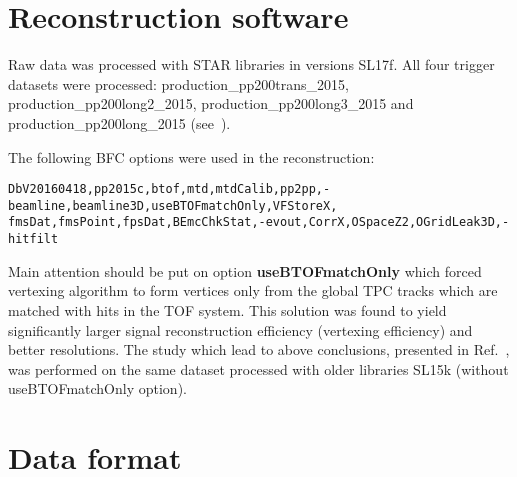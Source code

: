 

\section{Reconstruction software}\label{sec:recoSoftware}

Raw data was processed with STAR libraries in versions SL17f. All four trigger datasets were processed: production\_pp200trans\_2015, production\_pp200long2\_2015, production\_pp200long3\_2015 and production\_pp200long\_2015 (see~\cite{ProductionList}).

The following BFC options were used in the reconstruction:\vspace{-5pt}
\begin{verbatim}
DbV20160418,pp2015c,btof,mtd,mtdCalib,pp2pp,-beamline,beamline3D,useBTOFmatchOnly,VFStoreX,
fmsDat,fmsPoint,fpsDat,BEmcChkStat,-evout,CorrX,OSpaceZ2,OGridLeak3D,-hitfilt
\end{verbatim}
Main attention should be put on option \textbf{useBTOFmatchOnly} which forced vertexing algorithm to form vertices only from the global TPC tracks which are matched with hits in the TOF system. This solution was found to yield significantly larger signal reconstruction efficiency (vertexing efficiency) and better resolutions. The study which lead to above conclusions, presented in Ref.~\cite{RevertexingProposal}, was performed on the same dataset processed with older libraries SL15k (without useBTOFmatchOnly option).



\section{Data format}\label{sec:dataFormat}

